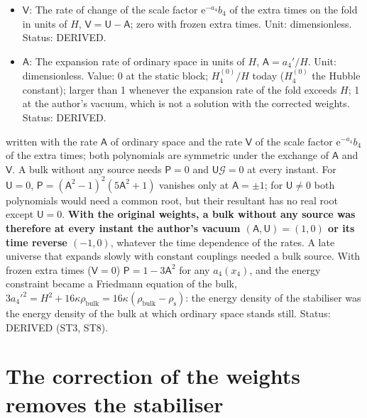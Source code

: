 \documentclass[
  10pt,
]{article}
\begin{document}
\begin{itemize}
  \(0 < z < \pi\); \(\sigma = 0\) is the fold \(z = \pi/2\),
  \(\sigma \to \mp\infty\) the tips \(z \to 0, \pi\); one period of
  \(x_0\) is the whole line \(-\infty < \sigma < \infty\). Unit: length.
  Status: DERIVED.
\item
  \(\mathsf{V}\): The rate of change of the scale factor
  \(\mathrm{e}^{-a_4}b_4\) of the extra times on the fold in units of
  \(H\), \(\mathsf{V} = \mathsf{U} - \mathsf{A}\); zero with frozen
  extra times. Unit: dimensionless. Status: DERIVED.
\item
  \(\mathsf{A}\): The expansion rate of ordinary space in units of
  \(H\), \(\mathsf{A} = a_4'/H\). Unit: dimensionless. Value: 0 at the
  static block; \(H_4^{(0)}/H\) today (\(H_4^{(0)}\) the Hubble
  constant); larger than 1 whenever the expansion rate of the fold
  exceeds \(H\); 1 at the author's vacuum, which is not a solution with
  the corrected weights. Status: DERIVED.
\end{itemize}

written with the rate \(\mathsf{A}\) of ordinary space and the rate
\(\mathsf{V}\) of the scale factor \(\mathrm{e}^{-a_4}b_4\) of the extra
times; both polynomials are symmetric under the exchange of
\(\mathsf{A}\) and \(\mathsf{V}\). A bulk without any source needs
\(\mathsf{P} = 0\) and \(\mathsf{U}\mathcal{G} = 0\) at every instant.
For \(\mathsf{U} = 0\),
\(\mathsf{P} = (\mathsf{A}^2 - 1)^2(5\mathsf{A}^2 + 1)\) vanishes only
at \(\mathsf{A} = \pm1\); for \(\mathsf{U} \ne 0\) both polynomials
would need a common root, but their resultant has no real root except
\(\mathsf{U} = 0\). \textbf{With the original weights, a bulk without
any source was therefore at every instant the author's vacuum
\((\mathsf{A}, \mathsf{U}) = (1, 0)\) or its time reverse \((-1, 0)\)},
whatever the time dependence of the rates. A late universe that expands
slowly with constant couplings needed a bulk source. With frozen extra
times (\(\mathsf{V} = 0\)) \(\mathsf{P} = 1 - 3\mathsf{A}^2\) for any
\(a_4(x_4)\), and the energy constraint became a Friedmann equation of
the bulk,
\(3a_4'^2 = H^2 + 16\kappa\rho_{\mathrm{bulk}} = 16\kappa(\rho_{\mathrm{bulk}} - \rho_{\mathrm{s}})\):
the energy density of the stabiliser was the energy density of the bulk
at which ordinary space stands still. Status: DERIVED (ST3, ST8).

\hypertarget{the-correction-of-the-weights-removes-the-stabiliser}{%
\section{The correction of the weights removes the
stabiliser}\label{the-correction-of-the-weights-removes-the-stabiliser}}
\end{document}
